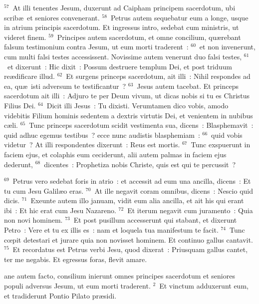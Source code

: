 ${}^{57}$~At illi tenentes Jesum, duxerunt ad Caipham principem sacerdotum, ubi scrib\ae\ et seniores convenerant.
${}^{58}$~Petrus autem sequebatur eum a longe, usque in atrium principis sacerdotum. Et ingressus intro, sedebat cum ministris, ut videret finem.
${}^{59}$~Principes autem sacerdotum, et omne concilium, qu\ae rebant falsum testimonium contra Jesum, ut eum morti traderent~:
${}^{60}$~et non invenerunt, cum multi falsi testes accessissent. Novissime autem venerunt duo falsi testes,
${}^{61}$~et dixerunt~: Hic dixit~: Possum destruere templum Dei, et post triduum re\ae dificare illud.
${}^{62}$~Et surgens princeps sacerdotum, ait illi~: Nihil respondes ad ea, qu\ae\ isti adversum te testificantur~?
${}^{63}$~Jesus autem tacebat. Et princeps sacerdotum ait illi~: Adjuro te per Deum vivum, ut dicas nobis si tu es Christus Filius Dei.
${}^{64}$~Dicit illi Jesus~: Tu dixisti. Verumtamen dico vobis, amodo videbitis Filium hominis sedentem a dextris virtutis Dei, et venientem in nubibus c\ae li.
${}^{65}$~Tunc princeps sacerdotum scidit vestimenta sua, dicens~: Blasphemavit~: quid adhuc egemus testibus~? ecce nunc audistis blasphemiam~:
${}^{66}$~quid vobis videtur~? At illi respondentes dixerunt~: Reus est mortis.
${}^{67}$~Tunc exspuerunt in faciem ejus, et colaphis eum ceciderunt, alii autem palmas in faciem ejus dederunt,
${}^{68}$~dicentes~: Prophetiza nobis Christe, quis est qui te percussit~?


${}^{69}$~Petrus vero sedebat foris in atrio~: et accessit ad eum una ancilla, dicens~: Et tu cum Jesu Galil\ae o eras.
${}^{70}$~At ille negavit coram omnibus, dicens~: Nescio quid dicis.
${}^{71}$~Exeunte autem illo januam, vidit eum alia ancilla, et ait his qui erant ibi~: Et hic erat cum Jesu Nazareno.
${}^{72}$~Et iterum negavit cum juramento~: Quia non novi hominem.
${}^{73}$~Et post pusillum accesserunt qui stabant, et dixerunt Petro~: Vere et tu ex illis es~: nam et loquela tua manifestum te facit.
${}^{74}$~Tunc cœpit detestari et jurare quia non novisset hominem. Et continuo gallus cantavit.
${}^{75}$~Et recordatus est Petrus verbi Jesu, quod dixerat~: Priusquam gallus cantet, ter me negabis. Et egressus foras, flevit amare.

\bchapter
{}ane autem facto, consilium inierunt omnes principes sacerdotum et seniores populi adversus Jesum, ut eum morti traderent.
${}^{2}$~Et vinctum adduxerunt eum, et tradiderunt Pontio Pilato pr\ae sidi.


